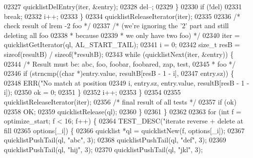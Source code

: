 \begin{DoxyCode}
{{{{{{{{{{{{{{{{{{{{{{{{{{{{{{{{{{{{{{{{{{{{{{{{{{{{{{{{{{{{{{{{{{{{{{{{{{{{{{{{{{{{02327                         quicklistDelEntry(iter, &entry);
02328                         del--;
02329                     \}
02330                     \textcolor{keywordflow}{if} (!del)
02331                         \textcolor{keywordflow}{break};
02332                     i++;
02333                 \}
02334                 quicklistReleaseIterator(iter);
02335 
02336                 \textcolor{comment}{/* check result of lrem -2 foo */}
02337                 \textcolor{comment}{/* (we're ignoring the '2' part and still deleting all foo}
02338 \textcolor{comment}{                 * because}
02339 \textcolor{comment}{                 * we only have two foo) */}
02340                 iter = quicklistGetIterator(ql, AL\_START\_TAIL);
02341                 i = 0;
02342                 size\_t resB = \textcolor{keyword}{sizeof}(resultB) / \textcolor{keyword}{sizeof}(*resultB);
02343                 \textcolor{keywordflow}{while} (quicklistNext(iter, &entry)) \{
02344                     \textcolor{comment}{/* Result must be: abc, foo, foobar, foobared, zap, test,}
02345 \textcolor{comment}{                     * foo */}
02346                     \textcolor{keywordflow}{if} (strncmp((\textcolor{keywordtype}{char} *)entry.value, resultB[resB - 1 - i],
02347                                 entry.sz)) \{
02348                         ERR(\textcolor{stringliteral}{"No match at position %
02349                             i, entry.sz, entry.value, resultB[resB - 1 - i]);
02350                         ok = 0;
02351                     \}
02352                     i++;
02353                 \}
02354 
02355                 quicklistReleaseIterator(iter);
02356                 \textcolor{comment}{/* final result of all tests */}
02357                 \textcolor{keywordflow}{if} (ok)
02358                     OK;
02359                 quicklistRelease(ql);
02360             \}
02361         \}
02362 
02363         \textcolor{keywordflow}{for} (\textcolor{keywordtype}{int} f = optimize\_start; f < 16; f++) \{
02364             TEST\_DESC(\textcolor{stringliteral}{"iterate reverse + delete at fill %
02365                       options[\_i]) \{
02366                 quicklist *ql = quicklistNew(f, options[\_i]);
02367                 quicklistPushTail(ql, \textcolor{stringliteral}{"abc"}, 3);
02368                 quicklistPushTail(ql, \textcolor{stringliteral}{"def"}, 3);
02369                 quicklistPushTail(ql, \textcolor{stringliteral}{"hij"}, 3);
02370                 quicklistPushTail(ql, \textcolor{stringliteral}{"jkl"}, 3);
}}}}}}}}}}}}}}}}}}}}}}}}}}}}}}}}}}}}}}}}}}}}}}}}}}}}}}}}}}}}}}}}}}}}}}}}}}}}}}}}}}}}}}
\end{DoxyCode}
